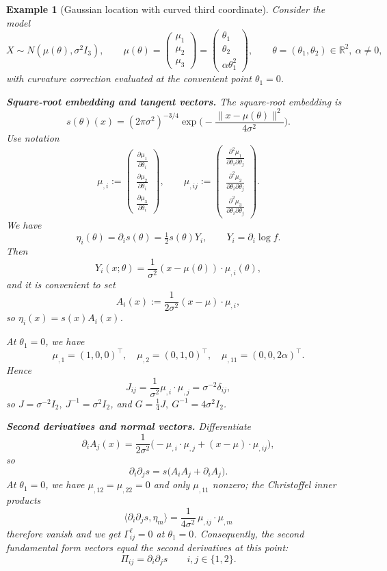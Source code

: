 \documentclass[pdflatex,sn-mathphys-num]{sn-jnl}%
\newcommand{\R}{\mathbb{R}}
\theoremstyle{thmstyleone}%
\theoremstyle{thmstyletwo}%
\newtheorem{example}{Example}%
\theoremstyle{thmstylethree}%
\begin{document}
\begin{example}[Gaussian location with curved third coordinate]
\label{ex:cg}
Consider the model
\[
X\sim N(\mu(\theta),\sigma^2 I_3),\qquad
\mu(\theta)=\begin{pmatrix}\mu_1\\[2pt]\mu_2\\[2pt]\mu_3\end{pmatrix}=\begin{pmatrix}\theta_1\\[2pt]\theta_2\\[2pt]\alpha\theta_1^2\end{pmatrix},\qquad
\theta=(\theta_1,\theta_2)\in\R^2,\ \alpha\neq0,
\]
with curvature correction evaluated at the convenient point \(\theta_1=0\). 

\noindent
\textbf{Square-root embedding and tangent vectors.}
The square-root embedding is
\[
s(\theta)(x)=(2\pi\sigma^2)^{-3/4}\exp\!\Big(-\frac{\|x-\mu(\theta)\|^2}{4\sigma^2}\Big).
\]
Use notation
\[
\mu_{,i}:=\begin{pmatrix}\tfrac{\partial\mu_1}{\partial \theta_i}\\[2pt]\tfrac{\partial\mu_2}{\partial \theta_i}\\[2pt]\tfrac{\partial\mu_3}{\partial \theta_i}\end{pmatrix},\qquad \mu_{,ij}:=\begin{pmatrix}\tfrac{\partial^2\mu_1}{\partial \theta_i \partial \theta_j}\\[2pt]\tfrac{\partial^2\mu_2}{\partial \theta_i \partial \theta_j}\\[2pt]\tfrac{\partial^2\mu_3}{\partial \theta_i \partial \theta_j}\end{pmatrix} .
\]
We have
\[
\eta_i(\theta)=\partial_i s(\theta)=\tfrac12 s(\theta)Y_i,\qquad
Y_i=\partial_i\log f.
\]
Then
\[
Y_i(x;\theta)=\frac{1}{\sigma^2}(x-\mu(\theta))\cdot\mu_{,i}(\theta),
\]
and it is convenient to set
\[
A_i(x):=\frac{1}{2\sigma^2}(x-\mu)\cdot\mu_{,i},
\]
so \( \eta_i(x)=s(x)A_i(x) \).

At \(\theta_1=0\), we have
\[
\mu_{,1}=(1,0,0)^\top,\quad \mu_{,2}=(0,1,0)^\top,\quad \mu_{,11}=(0,0,2\alpha)^\top.
\]
Hence
\[
J_{ij}=\frac{1}{\sigma^2}\mu_{,i}\cdot\mu_{,j}=\sigma^{-2}\delta_{ij},
\]
so \(J=\sigma^{-2}I_2,\ J^{-1}=\sigma^2 I_2\), and \(G=\tfrac14J,\ G^{-1}=4\sigma^2 I_2\).

\noindent
\textbf{Second derivatives and normal vectors.}
Differentiate
\[
\partial_i A_j(x)=\frac{1}{2\sigma^2}\big(-\mu_{,i}\cdot\mu_{,j} + (x-\mu)\cdot\mu_{,ij}\big),
\]
so
\[
\partial_i\partial_j s = s\big(A_iA_j + \partial_i A_j\big).
\]
At \(\theta_1=0\), we have \(\mu_{,12}=\mu_{,22}=0\) and only \(\mu_{,11}\) nonzero; the Christoffel inner products
\[
\langle\partial_i\partial_j s,\eta_m\rangle
= \frac{1}{4\sigma^2}\,\mu_{,ij}\cdot\mu_{,m}
\]
therefore vanish and we get \(\Gamma^\ell_{ij}=0\) at \(\theta_1=0\). Consequently, the second fundamental form vectors equal the second derivatives at this point:
\[
\Pi_{ij}=\partial_i\partial_j s \qquad i,j\in\{1,2\}.
\]


\end{example}
\end{document}
